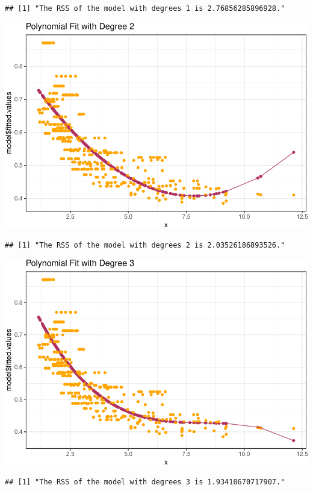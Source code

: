 \documentclass[]{article}
\begin{document}
\begin{verbatim}
## [1] "The RSS of the model with degrees 1 is 2.76856285896928."
\end{verbatim}

\includegraphics{hw7_files/figure-latex/unnamed-chunk-6-2.pdf}

\begin{verbatim}
## [1] "The RSS of the model with degrees 2 is 2.03526186893526."
\end{verbatim}

\includegraphics{hw7_files/figure-latex/unnamed-chunk-6-3.pdf}

\begin{verbatim}
## [1] "The RSS of the model with degrees 3 is 1.93410670717907."
\end{verbatim}
\end{document}
